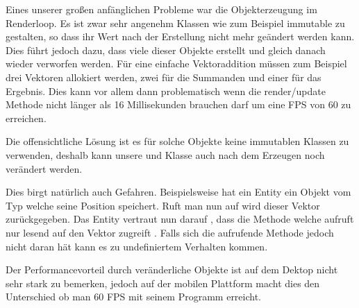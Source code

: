 
Eines unserer großen anfänglichen Probleme war die Objekterzeugung im Renderloop. Es ist zwar sehr angenehm Klassen wie zum Beispiel  immutable  zu gestalten, so dass ihr Wert nach der Erstellung nicht mehr geändert werden kann.
Dies führt jedoch dazu, dass viele dieser Objekte erstellt und gleich danach wieder verworfen werden. Für eine einfache Vektoraddition müssen zum Beispiel drei Vektoren allokiert werden, zwei für die Summanden und einer für das Ergebnis.
Dies kann vor allem dann problematisch wenn die render/update Methode nicht länger als 16 Millisekunden brauchen darf um eine FPS von 60 zu erreichen.

Die offensichtliche Lösung ist es für solche Objekte keine immutablen Klassen zu verwenden, deshalb kann unsere  und  Klasse auch nach dem Erzeugen noch verändert werden.

Dies birgt natürlich auch Gefahren. Beispielsweise hat ein Entity ein Objekt vom Typ  welche seine Position speichert. Ruft man nun  auf wird dieser Vektor zurückgegeben. Das Entity vertraut nun darauf , dass die Methode welche  aufruft nur lesend auf den Vektor zugreift . Falls sich die aufrufende Methode jedoch nicht daran hät kann es zu undefiniertem Verhalten kommen.

Der Performancevorteil durch veränderliche Objekte ist auf dem Dektop nicht sehr stark zu bemerken, jedoch auf der mobilen Plattform macht dies den Unterschied ob man 60 FPS mit seinem Programm erreicht.